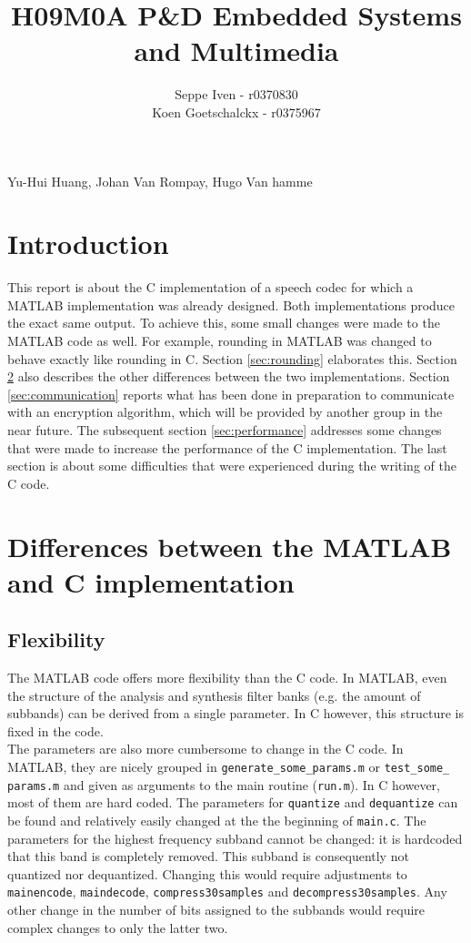 \documentclass[a4paper]{article}
\title{H09M0A P\&D Embedded Systems and Multimedia}
\author{Seppe Iven - r0370830 \\ Koen Goetschalckx - r0375967}
\begin{document}
 
\maketitle
\begin{center} Yu-Hui Huang, Johan Van Rompay, Hugo Van hamme
\end{center}

\section{Introduction}
This report is about the C implementation of a speech codec for which a MATLAB implementation was already designed. Both implementations produce the exact same output. To achieve this, some small changes were made to the MATLAB code as well. For example, rounding in MATLAB was changed to behave exactly like rounding in C. Section \ref{sec:rounding} elaborates this. Section \ref{sec:differences} also describes the other differences between the two implementations. Section \ref{sec:communication} reports what has been done in preparation to communicate with an encryption algorithm, which will be provided by another group in the near future. The subsequent section \ref{sec:performance} addresses some changes that were made to increase the performance of the C implementation. The last section is about some difficulties that were experienced during the writing of the C code.

\section{Differences between the MATLAB and C implementation}\label{sec:differences}

\subsection{Flexibility}
The MATLAB code offers more flexibility than the C code. In MATLAB, even the structure of the analysis and synthesis filter banks (e.g. the amount of subbands) can be derived from a single parameter. In C however, this structure is fixed in the code.\\

The parameters are also more cumbersome to change in the C code. In MATLAB, they are nicely grouped in \texttt{generate\_some\_params.m} or \texttt{test\_some\_ params.m} and given as arguments to the main routine (\texttt{run.m}). In C however, most of them are hard coded. The parameters for \texttt{quantize} and \texttt{dequantize} can be found and relatively easily changed at the the beginning of \texttt{main.c}. The parameters for the highest frequency subband cannot be changed: it is hardcoded that this band is completely removed. This subband is consequently not quantized nor dequantized. Changing this would require adjustments to \texttt{mainencode}, \texttt{maindecode}, \texttt{compress30samples} and \texttt{decompress30samples}. Any other change in the number of bits assigned to the subbands would require complex changes to only the latter two.\\
\end{document}
